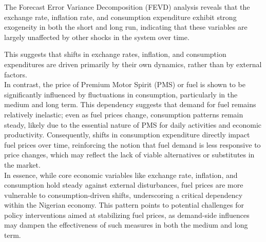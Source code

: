\documentclass{beamer}
\begin{document}
{\begin{frame}
The Forecast Error Variance Decomposition (FEVD) analysis reveals that the exchange rate, inflation rate, and consumption expenditure exhibit strong exogeneity in both the short and long run, indicating that these variables are largely unaffected by other shocks in the system over time.
\end{frame}
 This suggests that shifts in exchange rates, inflation, and consumption expenditures are driven primarily by their own dynamics, rather than by external factors.\\
In contrast, the price of Premium Motor Spirit (PMS) or fuel is shown to be significantly influenced by fluctuations in consumption, particularly in the medium and long term. This dependency suggests that demand for fuel remains relatively inelastic; even as fuel prices change, consumption patterns remain steady, likely due to the essential nature of PMS for daily activities and economic productivity. Consequently, shifts in consumption expenditure directly impact fuel prices over time, reinforcing the notion that fuel demand is less responsive to price changes, which may reflect the lack of viable alternatives or substitutes in the market. \\
In essence, while core economic variables like exchange rate, inflation, and consumption hold steady against external disturbances, fuel prices are more vulnerable to consumption-driven shifts, underscoring a critical dependency within the Nigerian economy. This pattern points to potential challenges for policy interventions aimed at stabilizing fuel prices, as demand-side influences may dampen the effectiveness of such measures in both the medium and long term.

}
\end{document}
